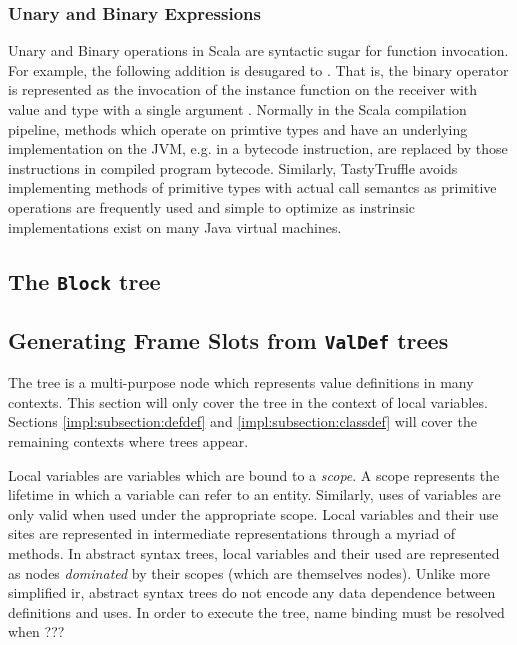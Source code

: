 \subsubsection{Unary and Binary Expressions}

Unary and Binary operations in Scala are syntactic sugar for function invocation. 
For example, the following addition  is desugared to . 
That is, the binary operator \scalainline{+} is represented as the invocation of the instance function  on the receiver with value  and type  with a single argument .
Normally in the Scala compilation pipeline, methods which operate on primtive types and have an underlying implementation on the JVM\cite{java:vm-spec}, e.g. in a bytecode instruction, are replaced by those instructions in compiled program bytecode. 
Similarly, TastyTruffle avoids implementing methods of primitive types with actual call semantcs as primitive operations are frequently used and simple to optimize as instrinsic implementations exist on many Java virtual machines.\cite{???}

\subsection{The \texttt{Block} tree}

\subsection{Generating Frame Slots from \texttt{ValDef} trees} 

The  tree is a multi-purpose node which represents value definitions in many contexts.
This section will only cover the  tree in the context of local variables.
Sections \ref{impl:subsection:defdef} and \ref{impl:subsection:classdef} will cover the remaining contexts where  trees appear.

Local variables are variables which are bound to a \textit{scope}. 
A scope represents the lifetime in which a variable can refer to an entity. 
Similarly, uses of variables are only valid when used under the appropriate scope. 
Local variables and their use sites are represented in intermediate representations through a myriad of methods. 
In abstract syntax trees, local variables and their used are represented as nodes \textit{dominated} by their scopes (which are themselves nodes). 
Unlike more simplified \acrshort{ir}, abstract syntax trees do not encode any data dependence between definitions and uses\cite{ssa}. 
In order to execute the tree, name binding must be resolved when ???

